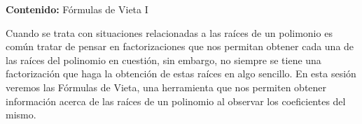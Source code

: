 {\Large\textbf{Contenido:} Fórmulas de Vieta I}

Cuando se trata con situaciones relacionadas a las raíces de un polimonio es común tratar de pensar en factorizaciones
que nos permitan obtener cada una de las raíces del polinomio en cuestión, sin embargo, no siempre se tiene una factorización que haga la obtención de estas raíces en algo sencillo.
En esta sesión veremos las Fórmulas de Vieta, una herramienta que nos permiten obtener información acerca de las raíces de un polinomio al observar los coeficientes del mismo.